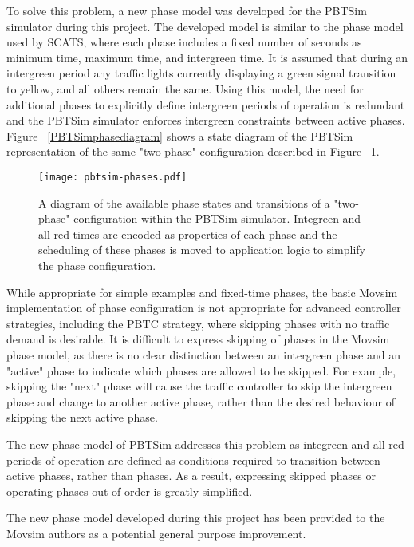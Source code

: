 To solve this problem, a new phase model was developed for the PBTSim simulator during this project. The developed model is similar to the phase model used by SCATS, where each phase includes a fixed number of seconds as minimum time, maximum time, and intergreen time. It is assumed that during an intergreen period any traffic lights currently displaying a green signal transition to yellow, and all others remain the same. Using this model, the need for additional phases to explicitly define intergreen periods of operation is redundant and the PBTSim simulator enforces intergreen constraints between active phases. Figure ~\ref{PBTSimphasediagram} shows a state diagram of the PBTSim representation of the same "two phase" configuration described in Figure ~\ref{movsimphasediagram}.

\begin{figure}[]
\centering
	\texttt{[image: pbtsim-phases.pdf]}
	\caption{ A diagram of the available phase states and transitions of a "two-phase" configuration within the PBTSim simulator. Integreen and all-red times are encoded as properties of each phase and the scheduling of these phases is moved to application logic to simplify the phase configuration. }
\label{movsimphasediagram}
\end{figure}

While appropriate for simple examples and fixed-time phases, the basic Movsim implementation of phase configuration is not appropriate for advanced controller strategies, including the PBTC strategy, where skipping phases with no traffic demand is desirable. It is difficult to express skipping of phases in the Movsim phase model, as there is no clear distinction between an intergreen phase and an "active" phase to indicate which phases are allowed to be skipped. For example, skipping the "next" phase will cause the traffic controller to skip the intergreen phase and change to another active phase, rather than the desired behaviour of skipping the next active phase.

The new phase model of PBTSim addresses this problem as integreen and all-red periods of operation are defined as conditions required to transition between active phases, rather than phases. As a result, expressing skipped phases or operating phases out of order is greatly simplified. 

The new phase model developed during this project has been provided to the Movsim authors as a potential general purpose improvement.



